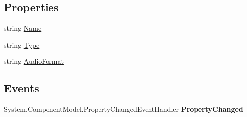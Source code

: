 \subsection*{Properties}
\begin{DoxyCompactItemize}
\item 
\hypertarget{class_amazon___price___finder_1_1amazon_1_1ecs_1_1_item_attributes_language_aebdc973d2e30336e3d761f02c548a819}{string \hyperlink{class_amazon___price___finder_1_1amazon_1_1ecs_1_1_item_attributes_language_aebdc973d2e30336e3d761f02c548a819}{Name}}\label{class_amazon___price___finder_1_1amazon_1_1ecs_1_1_item_attributes_language_aebdc973d2e30336e3d761f02c548a819}

\begin{DoxyCompactList}\small\item\em \end{DoxyCompactList}\item 
\hypertarget{class_amazon___price___finder_1_1amazon_1_1ecs_1_1_item_attributes_language_a928ea90eed496ae478f109877dd9a80e}{string \hyperlink{class_amazon___price___finder_1_1amazon_1_1ecs_1_1_item_attributes_language_a928ea90eed496ae478f109877dd9a80e}{Type}}\label{class_amazon___price___finder_1_1amazon_1_1ecs_1_1_item_attributes_language_a928ea90eed496ae478f109877dd9a80e}

\begin{DoxyCompactList}\small\item\em \end{DoxyCompactList}\item 
\hypertarget{class_amazon___price___finder_1_1amazon_1_1ecs_1_1_item_attributes_language_a1e9e8de2be3e54b6c7a51e1bdca1c07b}{string \hyperlink{class_amazon___price___finder_1_1amazon_1_1ecs_1_1_item_attributes_language_a1e9e8de2be3e54b6c7a51e1bdca1c07b}{Audio\-Format}}\label{class_amazon___price___finder_1_1amazon_1_1ecs_1_1_item_attributes_language_a1e9e8de2be3e54b6c7a51e1bdca1c07b}

\begin{DoxyCompactList}\small\item\em \end{DoxyCompactList}\end{DoxyCompactItemize}
\subsection*{Events}
\begin{DoxyCompactItemize}
\item 
\hypertarget{class_amazon___price___finder_1_1amazon_1_1ecs_1_1_item_attributes_language_ad7e21725fb21d7c51f58414b00d9a00e}{System.\-Component\-Model.\-Property\-Changed\-Event\-Handler {\bfseries Property\-Changed}}\label{class_amazon___price___finder_1_1amazon_1_1ecs_1_1_item_attributes_language_ad7e21725fb21d7c51f58414b00d9a00e}

\end{DoxyCompactItemize}


